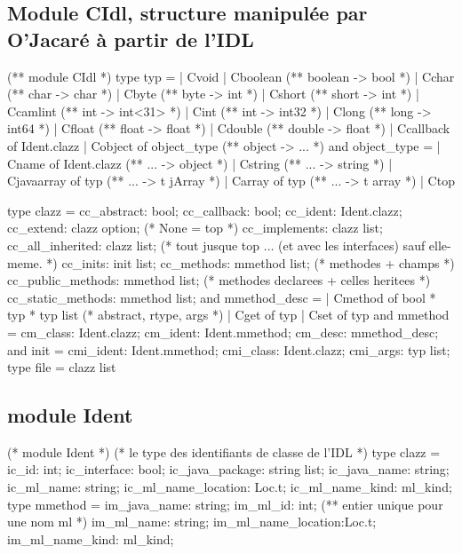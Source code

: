 \documentclass[a4paper, 11pt, notitlepage]{article}
\begin{document}
\newpage
\subsection*{Module CIdl, structure manipulée par O'Jacaré à partir de
  l'IDL}
\begin{OCaml}
(**  module CIdl  *)
type typ =
  | Cvoid
  | Cboolean (** boolean -> bool *)
  | Cchar (** char -> char *)
  | Cbyte (** byte -> int *)
  | Cshort (** short -> int *)
  | Ccamlint (** int -> int<31> *)
  | Cint (** int -> int32 *)
  | Clong (** long -> int64 *)
  | Cfloat (** float -> float *)
  | Cdouble (** double -> float *)
  | Ccallback of Ident.clazz
  | Cobject of object_type (** object -> ... *)
and object_type = 
  | Cname of Ident.clazz (** ... -> object *)
  | Cstring (** ... -> string *)
  | Cjavaarray of typ (** ... -> t jArray *) 
  | Carray of typ (** ... -> t array *) 
  | Ctop

type clazz = {
    cc_abstract: bool;
    cc_callback: bool;
    cc_ident: Ident.clazz;
    cc_extend: clazz option; (* None = top *)
    cc_implements: clazz list;
    cc_all_inherited: clazz list; (* tout jusque top ... (et avec les interfaces) sauf elle-meme. *)
    cc_inits: init list;
    cc_methods: mmethod list; (* methodes + champs *)
    cc_public_methods: mmethod list; (* methodes declarees + celles heritees *)
    cc_static_methods: mmethod list; 
  }
and mmethod_desc = 
  | Cmethod of bool * typ * typ list (* abstract, rtype, args *)
  | Cget of typ
  | Cset of typ
and mmethod = {
    cm_class: Ident.clazz;
    cm_ident: Ident.mmethod; 
    cm_desc: mmethod_desc;
  }         
and init = {
    cmi_ident: Ident.mmethod;
    cmi_class: Ident.clazz;
    cmi_args: typ list;
  }
type file = clazz list
\end{OCaml}

\subsection*{module Ident}
\begin{OCaml}
(* module Ident  *)
(* le type des identifiants de classe de l'IDL *)
type clazz = {
    ic_id: int;
    ic_interface: bool;
    ic_java_package: string list;
    ic_java_name: string;
    ic_ml_name: string;
    ic_ml_name_location: Loc.t;
    ic_ml_name_kind: ml_kind;
  }
type mmethod = {
    im_java_name: string;
    im_ml_id: int; (** entier unique pour une nom ml *)
    im_ml_name: string;
    im_ml_name_location:Loc.t;
    im_ml_name_kind: ml_kind;
  }
\end{OCaml}
\ 
\end{document}
